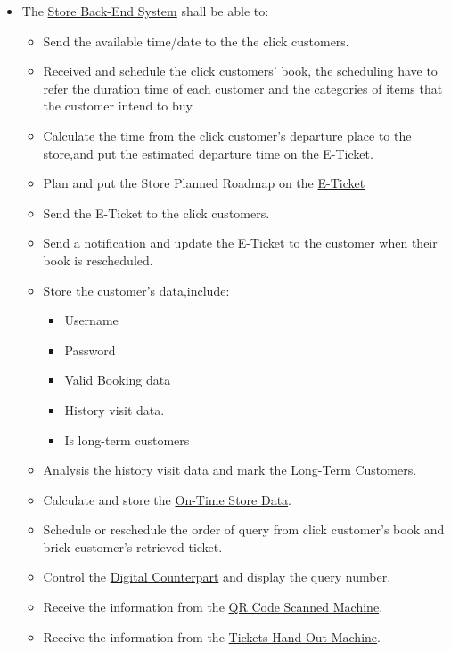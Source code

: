 \documentclass[a4paper,12pt]{book}
\begin{document}
\begin{itemize}
	\item The \hyperref[Definitions]{Store Back-End System} shall be able to:
	\begin{itemize}
		\item Send the available time/date to the the click customers.
		\item Received and schedule the click customers' book, the scheduling have to refer the duration time of each customer and the categories of items that the customer intend to buy
		\item Calculate the time from the click customer's departure place to the store,and put the estimated departure time on the E-Ticket.
		\item Plan and put the Store Planned Roadmap on the \hyperref[Definitions]{E-Ticket}
		\item Send the  E-Ticket to the click customers.
		\item Send a notification and update the E-Ticket to the customer when their book is rescheduled.
		\item Store the customer's data,include:
		\begin{itemize}
			\item Username
			\item Password
			\item Valid Booking data
			\item History visit data.
			\item Is long-term customers
		\end{itemize}
		\item Analysis the history visit data and mark the \hyperref[Definitions]{Long-Term Customers}.
		\item Calculate and store the \hyperref[Definitions]{On-Time Store Data}.
		\item Schedule or reschedule the order of query from click customer's book and brick customer's retrieved ticket.
		\item Control the \hyperref[Definitions]{Digital Counterpart} and display the query number.
		\item Receive the information from the \hyperref[Definitions]{QR Code Scanned Machine}.
		\item Receive the information from the \hyperref[Definitions]{Tickets Hand-Out Machine}.
	\end{itemize}
\end{itemize}
\end{document}
